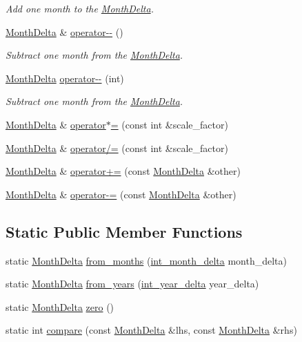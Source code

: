 \begin{DoxyCompactItemize}
\begin{DoxyCompactList}\small\item\em \-Add one month to the \hyperlink{structMonthDelta}{\-Month\-Delta}. \end{DoxyCompactList}\item 
\hyperlink{structMonthDelta}{\-Month\-Delta} \& \hyperlink{structMonthDelta_a792c4dd313efad2aec9dc80b7d18dc4e}{operator-\/-\/} ()
\begin{DoxyCompactList}\small\item\em \-Subtract one month from the \hyperlink{structMonthDelta}{\-Month\-Delta}. \end{DoxyCompactList}\item 
\hyperlink{structMonthDelta}{\-Month\-Delta} \hyperlink{structMonthDelta_a57b2bfc986e466491dc6ae5546988de7}{operator-\/-\/} (int)
\begin{DoxyCompactList}\small\item\em \-Subtract one month from the \hyperlink{structMonthDelta}{\-Month\-Delta}. \end{DoxyCompactList}\item 
\hyperlink{structMonthDelta}{\-Month\-Delta} \& \hyperlink{structMonthDelta_a63ed19158fcd7fd743ecb4afb83ff874}{operator$\ast$=} (const int \&scale\-\_\-factor)
\item 
\hyperlink{structMonthDelta}{\-Month\-Delta} \& \hyperlink{structMonthDelta_aa8333e32a1bcd75fd93410574af2ec00}{operator/=} (const int \&scale\-\_\-factor)
\item 
\hyperlink{structMonthDelta}{\-Month\-Delta} \& \hyperlink{structMonthDelta_aa244bc614894a3daaf8d71f0c9c6202b}{operator+=} (const \hyperlink{structMonthDelta}{\-Month\-Delta} \&other)
\item 
\hyperlink{structMonthDelta}{\-Month\-Delta} \& \hyperlink{structMonthDelta_ad62de2e3686f5b93088eb371e9ff4c87}{operator-\/=} (const \hyperlink{structMonthDelta}{\-Month\-Delta} \&other)
\end{DoxyCompactItemize}
\subsection*{\-Static \-Public \-Member \-Functions}
\begin{DoxyCompactItemize}
\item 
static \hyperlink{structMonthDelta}{\-Month\-Delta} \hyperlink{structMonthDelta_afc96dd6ca914abc1ddd067f8f3755a89}{from\-\_\-months} (\hyperlink{types_8h_adc711c00c117528b40875ad0119c687f}{int\-\_\-month\-\_\-delta} month\-\_\-delta)
\item 
static \hyperlink{structMonthDelta}{\-Month\-Delta} \hyperlink{structMonthDelta_a02632b6ef33850d9329bd04a686ce1ed}{from\-\_\-years} (\hyperlink{types_8h_a39556f27d189e3da1fcb3db910239761}{int\-\_\-year\-\_\-delta} year\-\_\-delta)
\item 
static \hyperlink{structMonthDelta}{\-Month\-Delta} \hyperlink{structMonthDelta_a847cb9c956c133957dbaffb32fb9bd15}{zero} ()
\item 
static int \hyperlink{structMonthDelta_afb632f08f6278bcf7dfd5aef0cb12322}{compare} (const \hyperlink{structMonthDelta}{\-Month\-Delta} \&lhs, const \hyperlink{structMonthDelta}{\-Month\-Delta} \&rhs)
\end{DoxyCompactItemize}
